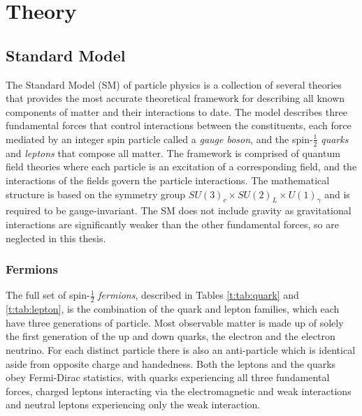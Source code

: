 \chapter{Theory}\label{c:Theory}

\section{Standard Model}


The Standard Model (SM) of particle physics is a collection of several theories that provides the most accurate theoretical framework for describing all known components of matter and their interactions to date. The model describes three fundamental forces that control interactions between the constituents, each force mediated by an integer spin particle called a \textit{gauge boson}, and the spin-$\frac{1}{2}$ \textit{quarks} and \textit{leptons} that compose all matter. The framework is comprised of quantum field theories where each particle is an excitation of a corresponding field, and the interactions of the fields govern the particle interactions. The mathematical structure is  based on the symmetry group $SU(3)_c\times SU(2)_L\times U(1)_\gamma$ and is required to be gauge-invariant. The SM does not include gravity as gravitational interactions are significantly weaker than the other fundamental forces, so are neglected in this thesis. 

	\subsection{Fermions}
	
		The full set of spin-$\frac{1}{2}$ \textit{fermions}, described in Tables \ref{t:tab:quark} and \ref{t:tab:lepton}, is the combination of the quark and lepton families, which each have three generations of particle. Most observable matter is made up of solely the first generation of the  up and down quarks, the electron and the electron neutrino. For each distinct particle there is also an anti-particle which is identical aside from opposite charge and handedness. Both the leptons and the quarks obey Fermi-Dirac statistics, with quarks experiencing all three fundamental forces, charged leptons interacting via the electromagnetic and weak interactions and neutral leptons experiencing only the weak interaction. 
		
